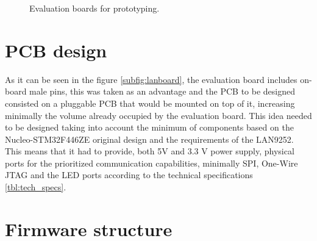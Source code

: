 
\begin{figure}[ht]
    \centering
    \hfill
    \caption{Evaluation boards for prototyping.}
    \label{fig:evalboards}
\end{figure}

\section{PCB design}\label{sec:pcb_proposal}
As it can be seen in the figure \ref{subfig:lanboard}, the evaluation board includes on-board male pins, this was taken as an advantage and the PCB to be designed
consisted on a pluggable PCB that would be mounted on top of it, increasing minimally the volume already occupied by the evaluation board. This idea needed to be 
designed taking into account the minimum of components based on the Nucleo-STM32F446ZE original design and the requirements of the LAN9252. This means that 
it had to provide, both 5V and 3.3 V power supply, physical ports for the prioritized communication capabilities, minimally SPI, One-Wire JTAG and the LED ports 
according to the technical specifications \ref{tbl:tech_specs}.

\section{Firmware structure}

